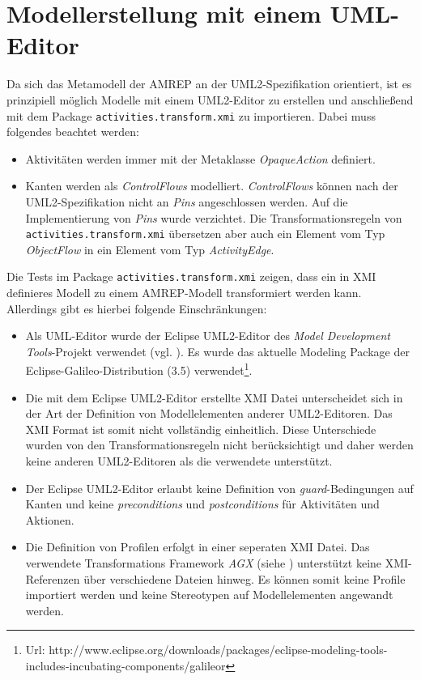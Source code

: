 \section{Modellerstellung mit einem UML-Editor}\label{amrep-use-umleditor}
Da sich das Metamodell der AMREP an der UML2-Spezifikation orientiert, ist es prinzipiell möglich Modelle mit einem UML2-Editor zu erstellen und anschließend mit dem Package \texttt{activities.transform.xmi} zu importieren. Dabei muss folgendes beachtet werden:
\begin{itemize}
\item Aktivitäten werden immer mit der Metaklasse \emph{OpaqueAction} definiert.
\item Kanten werden als \emph{ControlFlows} modelliert. \emph{ControlFlows} können nach der UML2-Spezifikation nicht an \emph{Pins} angeschlossen werden. Auf die Implementierung von \emph{Pins} wurde verzichtet. Die Transformationsregeln von \texttt{activities.transform.xmi} übersetzen aber auch ein Element vom Typ \emph{ObjectFlow} in ein Element vom Typ \emph{ActivityEdge}.
\end{itemize}

Die Tests im Package \texttt{activities.transform.xmi} zeigen, dass ein in XMI definieres Modell zu einem AMREP-Modell transformiert werden kann. Allerdings gibt es hierbei folgende Einschränkungen:
\begin{itemize}
\item Als UML-Editor wurde der Eclipse UML2-Editor des \emph{Model Development Tools}-Projekt verwendet (vgl. \citep{EclipseMDT}). Es wurde das aktuelle Modeling Package der Eclipse-Galileo-Distribution (3.5) verwendet\footnote
{Url: http://www.eclipse.org/downloads/packages/eclipse-modeling-tools-includes-incubating-components/galileor}.
\item Die mit dem Eclipse UML2-Editor erstellte XMI Datei unterscheidet sich in der Art der Definition von Modellelementen anderer UML2-Editoren. Das XMI Format ist somit nicht vollständig einheitlich. Diese Unterschiede wurden von den Transformationsregeln nicht berücksichtigt und daher werden keine anderen UML2-Editoren als die verwendete unterstützt.
\item Der Eclipse UML2-Editor erlaubt keine Definition von \emph{guard}-Bedingungen auf Kanten und keine \emph{preconditions} und \emph{postconditions} für Aktivitäten und Aktionen. %
\item Die Definition von Profilen erfolgt in einer seperaten XMI Datei. Das verwendete Transformations Framework \emph{AGX} (siehe \citep{AGX}) unterstützt keine XMI-Referenzen über verschiedene Dateien hinweg. Es können somit keine Profile importiert werden und keine Stereotypen auf Modellelementen angewandt werden.
\end{itemize}

